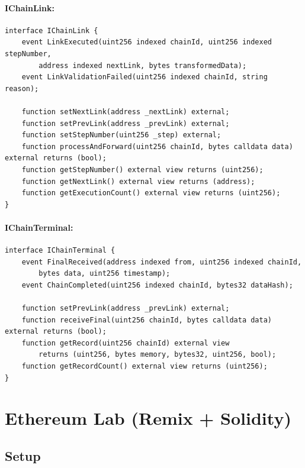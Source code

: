 \documentclass[11pt,a4paper]{article}
\begin{document}
\paragraph{IChainLink:}
\begin{lstlisting}[style=solidity]
interface IChainLink {
    event LinkExecuted(uint256 indexed chainId, uint256 indexed stepNumber,
        address indexed nextLink, bytes transformedData);
    event LinkValidationFailed(uint256 indexed chainId, string reason);

    function setNextLink(address _nextLink) external;
    function setPrevLink(address _prevLink) external;
    function setStepNumber(uint256 _step) external;
    function processAndForward(uint256 chainId, bytes calldata data) external returns (bool);
    function getStepNumber() external view returns (uint256);
    function getNextLink() external view returns (address);
    function getExecutionCount() external view returns (uint256);
}
\end{lstlisting}

\paragraph{IChainTerminal:}
\begin{lstlisting}[style=solidity]
interface IChainTerminal {
    event FinalReceived(address indexed from, uint256 indexed chainId,
        bytes data, uint256 timestamp);
    event ChainCompleted(uint256 indexed chainId, bytes32 dataHash);

    function setPrevLink(address _prevLink) external;
    function receiveFinal(uint256 chainId, bytes calldata data) external returns (bool);
    function getRecord(uint256 chainId) external view
        returns (uint256, bytes memory, bytes32, uint256, bool);
    function getRecordCount() external view returns (uint256);
}
\end{lstlisting}

\section{Ethereum Lab (Remix + Solidity)}

\subsection{Setup}
\end{document}
